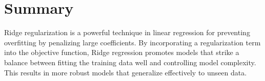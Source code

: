 \documentclass{article}
\begin{document}
\section*{Summary}

Ridge regularization is a powerful technique in linear regression for preventing overfitting by penalizing large coefficients. By incorporating a regularization term into the objective function, Ridge regression promotes models that strike a balance between fitting the training data well and controlling model complexity. This results in more robust models that generalize effectively to unseen data.
\end{document}
